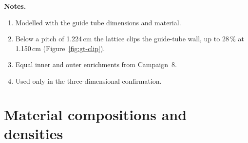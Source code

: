 \setlength{\tabcolsep}{6pt}
\normalsize

\noindent \textbf{Notes.}
\begin{enumerate}[label=(\alph*), nosep]
  \item Modelled with the guide tube dimensions and material.
  \item Below a pitch of 1.224\,cm the lattice clips the guide-tube wall, up to 28\,\% at 1.150\,cm (Figure~\ref{fig:gt-clip}).
  \item Equal inner and outer enrichments from Campaign~8.
  \item Used only in the three-dimensional confirmation.
\end{enumerate}

\section{Material compositions and densities}
\label{app:inputs-materials}

